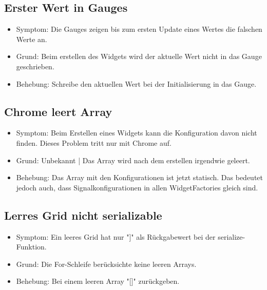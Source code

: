 \documentclass[qualitaetssicherung.tex]{subfiles}
\begin{document}
	\subsection{Erster Wert in Gauges}
	\begin{itemize}
		\item
		Symptom: Die Gauges zeigen bis zum ersten Update eines Wertes die falschen Werte an.
		\item
		Grund: Beim erstellen des Widgets wird der aktuelle Wert nicht in das Gauge geschrieben.
		\item
		Behebung: Schreibe den aktuellen Wert bei der Initialisierung in das Gauge.
	\end{itemize}	
	
	\subsection{Chrome leert Array}
	\begin{itemize}
		\item
		Symptom: Beim Erstellen eines Widgets kann die Konfiguration davon nicht finden. Dieses Problem tritt nur mit Chrome auf.
		\item
		Grund: Unbekannt | Das Array wird nach dem erstellen irgendwie geleert.
		\item
		Behebung: Das Array mit den Konfigurationen ist jetzt statisch. Das bedeutet jedoch auch, dass Signalkonfigurationen in allen WidgetFactories gleich sind. 
	\end{itemize}	
	
	\subsection{Lerres Grid nicht serializable}
	\begin{itemize}
		\item
		Symptom: Ein leeres Grid hat nur "]" als Rückgabewert bei der serialize-Funktion.
		\item
		Grund: Die For-Schleife berücksichte keine leeren Arrays.
		\item
		Behebung: Bei einem leeren Array "[]" zurückgeben. 
	\end{itemize}	
\end{document}

